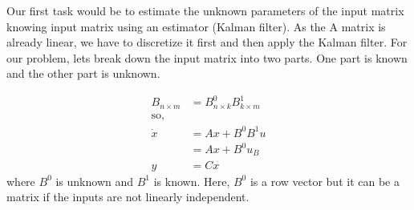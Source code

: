 \documentclass[12pt]{article}
\begin{document}
Our first task would be to estimate the unknown parameters of the input matrix knowing input matrix using an estimator (Kalman filter). As the A matrix is already linear, we have to discretize it first and then apply the Kalman filter. For our problem, lets break down the input matrix into two parts. One part is known and the other part is unknown.


\begin{align*}
    B_{n \times m} &= B^{0}_{n \times k} B^{1}_{k \times m} \\ 
    \text{so,}  \\
    \dot{x} &= Ax + B^{0} B^{1} u \\
    &= Ax + B^{0} u_{B} \\
    y &= Cx 
\end{align*}
where $B^{0}$ is unknown and $B^{1}$ is known. Here, $B^{0}$ is a row vector but it can be a matrix if the inputs are not linearly independent.
\end{document}
